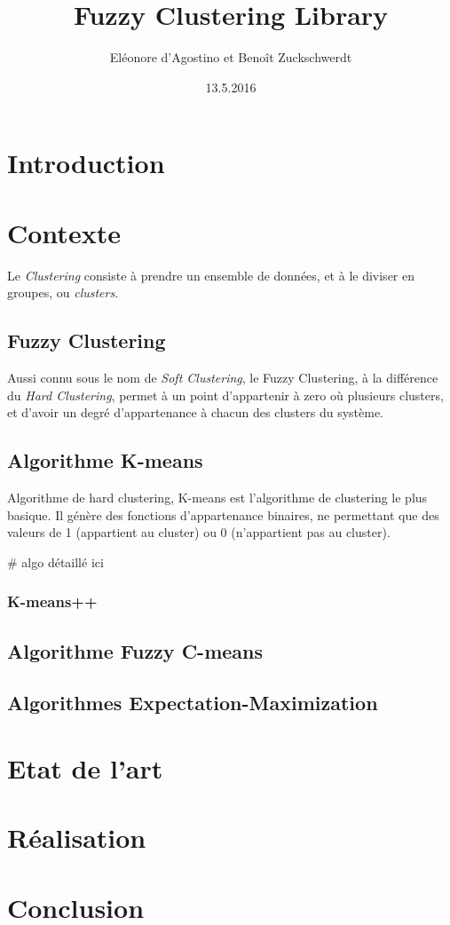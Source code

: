 \documentclass{article}
\title{Fuzzy Clustering Library}
\date{13.5.2016}
\author{Eléonore d'Agostino et Benoît Zuckschwerdt}
\begin{document}
  \maketitle
  \tableofcontents
  \newpage
  
  \section{Introduction}
  
  \section{Contexte}
  
    Le \textit{Clustering} consiste à prendre un ensemble de données, et à le diviser en groupes, ou \textit{clusters}.
  
    \subsection{Fuzzy Clustering}
    
      Aussi connu sous le nom de \textit{Soft Clustering}, le Fuzzy Clustering, à la différence du \textit{Hard Clustering}, permet à un point d'appartenir à zero où plusieurs clusters, et d'avoir un degré d'appartenance à chacun des clusters du système.
    
    \subsection{Algorithme K-means}
    
      Algorithme de hard clustering, K-means est l'algorithme de clustering le plus basique. Il génère des fonctions d'appartenance binaires, ne permettant que des valeurs de 1 (appartient au cluster) ou 0 (n'appartient pas au cluster).
      
      \# algo détaillé ici
      
      \subsubsection{K-means++}
    
    \subsection{Algorithme Fuzzy C-means}
    
    \subsection{Algorithmes Expectation-Maximization}
  
  \section{Etat de l'art}
  
  \section{Réalisation}
  
  \section{Conclusion}


\nocite{*}
\end{document}
